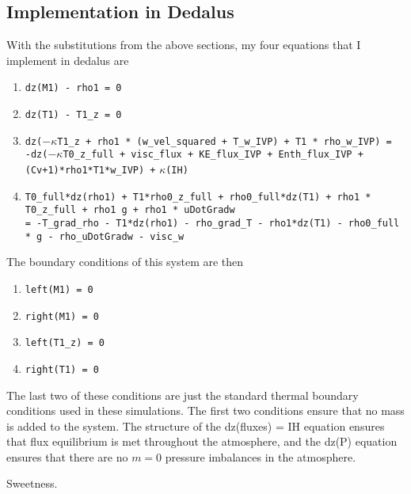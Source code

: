 \documentclass[aps, pre, onecolumn, nofootinbib, notitlepage, groupedaddress, amsfonts, amssymb, amsmath, longbibliography]{revtex4-1}
\begin{document}
\subsection{Implementation in Dedalus}
With the substitutions from the above sections, my four equations that I implement in dedalus are
\begin{enumerate}
\item \texttt{dz(M1) - rho1 = 0}
\item \texttt{dz(T1) - T1\_z = 0}
\item \texttt{dz(}$-\kappa$\texttt{T1\_z + rho1 * (w\_vel\_squared + T\_w\_IVP) + T1 * rho\_w\_IVP) =} \\
	  \texttt{-dz(}$-\kappa$\texttt{T0\_z\_full + visc\_flux + KE\_flux\_IVP + Enth\_flux\_IVP + (Cv+1)*rho1*T1*w\_IVP) +} $\kappa$\texttt{(IH)}
\item \texttt{T0\_full*dz(rho1) + T1*rho0\_z\_full + rho0\_full*dz(T1) + rho1 * T0\_z\_full + rho1 g + rho1 * uDotGradw} \\
	  \texttt{= -T\_grad\_rho - T1*dz(rho1) - rho\_grad\_T - rho1*dz(T1) - rho0\_full * g - rho\_uDotGradw - visc\_w }
\end{enumerate}
The boundary conditions of this system are then
\begin{enumerate}
\item \texttt{left(M1) = 0}
\item \texttt{right(M1) = 0}
\item \texttt{left(T1\_z) = 0}
\item \texttt{right(T1) = 0}
\end{enumerate}
The last two of these conditions are just the standard thermal boundary conditions used in these
simulations.  The first two conditions ensure that no mass is added to the system.  The structure of
the dz(fluxes) = IH equation ensures that flux equilibrium is met throughout the atmosphere, and the
dz(P) equation ensures that there are no $m = 0$ pressure imbalances in the atmosphere.

Sweetness.



\end{document}
